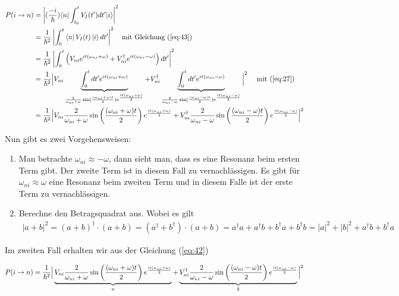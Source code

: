 \begin{align}
  \label{eq:42}
 P(i\rightarrow n) &= \left|(\frac{-i}{\hbar})\langle n |\int_{t_0}^t V_I(t')dt'|i\rangle\right|^2 \notag \\
&= \frac{1}{\hbar^2}\left| \int_{0}^t \left\langle n \right|  V_I(t) \left| i \right\rangle dt'\right|^2  \quad \text{mit Gleichung (\ref{eq:43})} \notag\\
&= \frac{1}{\hbar^2}\left| \int_{0}^t \left( V_{ni} e^{it(\omega_{ni}+\omega) }+ V^\dagger_{ni} e^{it(\omega_{ni}-\omega)} \right)  dt'\right|^2 \notag\\
&= \frac{1}{\hbar^2}  \Big|V_{ni}\underbrace{\int_{0}^t dt' e^{it(\omega_{ni}+\omega) }}_{  \frac{2}{\omega_{ni}+\omega}\sin(\frac{(\omega_{ni}+\omega) t}{2})e^{\frac{it(\omega_{ni}+\omega)}{2}}  }+ V^\dagger_{ni}\underbrace{ \int_{0}^t dt'  e^{it(\omega_{ni}-\omega)}}_{ \frac{2}{\omega_{ni}-\omega}\sin(\frac{(\omega_{ni}-\omega) t}{2})e^{\frac{it(\omega_{ni}-\omega)}{2}} }\Big|^2 \quad \text{ mit (\ref{eq:27})}\notag\\
&= \frac{1}{\hbar^2}  \Big|V_{ni} \frac{2}{\omega_{ni}+\omega}\sin\left(\frac{(\omega_{ni}+\omega) t}{2}\right)e^{\frac{it(\omega_{ni}+\omega)}{2}} + V^\dagger_{ni} \frac{2}{\omega_{ni}-\omega}\sin\left(\frac{(\omega_{ni}-\omega) t}{2}\right)e^{\frac{it(\omega_{ni}-\omega)}{2} }\Big|^2 \notag\\
\end{align}

Nun gibt es zwei Vorgehensweisen:

\begin{enumerate}
\item Man betrachte \(\omega_{ni}\approx - \omega\), dann sieht man, dass es eine Resonanz beim ersten Term gibt. Der zweite Term ist in diesem Fall zu vernachlässigen. Es gibt für \(\omega_{ni}\approx \omega\) eine Resonanz beim zweiten Term und in diesem Falle ist der erste Term zu vernachlässigen.
\item Berechne den Betragsquadrat aus. Wobei es gilt
  \begin{align}
    \label{eq:44}
    |a+b|^2 = (a+b)^\dagger \cdot(a+b) = (a^\dagger+b^\dagger)\cdot(a+b) = a^\dagger a+a^\dagger b + b^\dagger a + b^\dagger b = |a|^2+|b|^2 + a^\dagger b + b^\dagger a 
  \end{align}
\end{enumerate}

Im zweiten Fall erhalten wir aus der Gleichung (\ref{eq:42})

\begin{align}
  \label{eq:45}
  P(i\rightarrow n) &= \frac{1}{\hbar^2}  \Big| \underbr{V_{ni} \frac{2}{\omega_{ni}+\omega}\sin\left(\frac{(\omega_{ni}+\omega) t}{2}\right)e^{\frac{it(\omega_{ni}+\omega)}{2}}}_{a} +\underbr{ V^\dagger_{ni} \frac{2}{\omega_{ni}-\omega}\sin\left(\frac{(\omega_{ni}-\omega) t}{2}\right)e^{\frac{it(\omega_{ni}-\omega)}{2} }}_{b}\Big|^2 \notag\\
\end{align}

